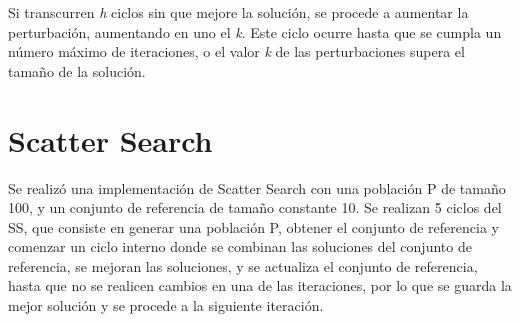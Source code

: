 \documentclass{ci5652}
\begin{document}
Si transcurren \textit{h} ciclos sin que mejore la solución, se procede a aumentar la perturbación, aumentando en uno el \textit{k}. Este ciclo ocurre hasta que se cumpla un número máximo de iteraciones, o el valor \textit{k} de las perturbaciones supera el tamaño de la solución.

%
%

\section{Scatter Search}
Se realizó una implementación de Scatter Search con una población P de tamaño 100, y un conjunto de referencia de tamaño constante 10. Se realizan 5 ciclos del SS, que consiste en generar una población P, obtener el conjunto de referencia y comenzar un ciclo interno donde se combinan las soluciones del conjunto de referencia, se mejoran las soluciones, y se actualiza el conjunto de referencia, hasta que no se realicen cambios en una de las iteraciones, por lo que se guarda la mejor solución y se procede a la siguiente iteración.
\end{document}
